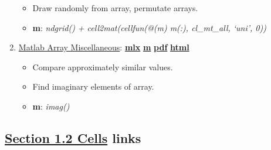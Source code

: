 \documentclass[
]{book}
\providecommand{\tightlist}{%
  \setlength{\itemsep}{0pt}\setlength{\parskip}{0pt}}
\begin{document}
\begin{enumerate}
  \begin{itemize}
  \tightlist
  \item
    Draw randomly from array, permutate arrays.
  \item
    \textbf{m}: \emph{ndgrid() + cell2mat(cellfun(@(m) m(:), cl\_mt\_all, `uni', 0))}
  \end{itemize}
\item
  \href{https://fanwangecon.github.io/M4Econ/amto/array/htmlpdfm/fs_img.html}{Matlab Array Miscellaneous}: \href{https://github.com/FanWangEcon/M4Econ/blob/master/amto/array/fs_img.mlx}{\textbf{mlx}} \textbar{} \href{https://github.com/FanWangEcon/M4Econ/blob/master/amto/array/htmlpdfm/fs_img.m}{\textbf{m}} \textbar{} \href{https://github.com/FanWangEcon/M4Econ/blob/master/amto/array/htmlpdfm/fs_img.pdf}{\textbf{pdf}} \textbar{} \href{https://fanwangecon.github.io/M4Econ/amto/array/htmlpdfm/fs_img.html}{\textbf{html}}

  \begin{itemize}
  \tightlist
  \item
    Compare approximately similar values.
  \item
    Find imaginary elements of array.
  \item
    \textbf{m}: \emph{imag()}
  \end{itemize}
\end{enumerate}

\hypertarget{section-1.2-cellscells-links}{%
\subsection{\texorpdfstring{\protect\hyperlink{cells}{Section 1.2 Cells} links}{Section 1.2 Cells links}}\label{section-1.2-cellscells-links}}
\end{document}
